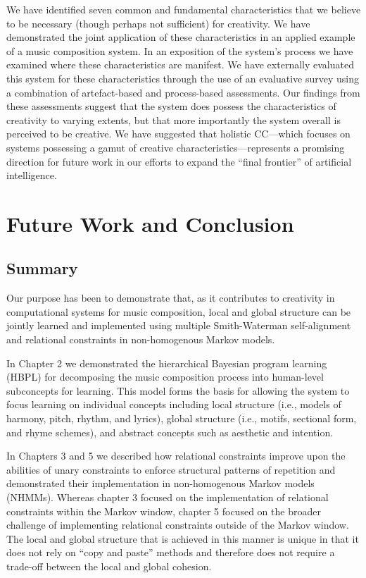 \documentclass[phd,electronic,oneside,twosidetoc,letterpaper,chaptercenter,parttop,lol,lof,lot]{byumsphd}
\begin{document}
We have identified seven common and fundamental characteristics that we believe to be necessary (though perhaps not sufficient) for creativity. We have demonstrated the joint application of these characteristics in an applied example of a music composition system. In an exposition of the system's process we have examined where these characteristics are manifest. We have externally evaluated this system for these characteristics through the use of an evaluative survey using a combination of artefact-based and process-based assessments. Our findings from these assessments suggest that the system does possess the characteristics of creativity to varying extents, but that more importantly the system overall is perceived to be creative. We have suggested that holistic CC---which focuses on systems possessing a gamut of creative characteristics---represents a promising direction for future work in our efforts to expand the ``final frontier'' of artificial intelligence.

\chapter{Future Work and Conclusion}

\section{Summary}

Our purpose has been to demonstrate that, as it contributes to creativity in computational systems for music composition, local and global structure can be jointly learned and implemented using multiple Smith-Waterman self-alignment and relational constraints in non-homogenous Markov models.

In Chapter 2 we demonstrated the hierarchical Bayesian program learning (HBPL) for decomposing the music composition process into human-level subconcepts for learning. This model forms the basis for allowing the system to focus learning on individual concepts including local structure (i.e., models of harmony, pitch, rhythm, and lyrics), global structure (i.e., motifs, sectional form, and rhyme schemes), and abstract concepts such as aesthetic and intention.

In Chapters 3 and 5 we described how relational constraints improve upon the abilities of unary constraints to enforce structural patterns of repetition and demonstrated their implementation in non-homogenous Markov models (NHMMs). Whereas chapter 3 focused on the implementation of relational constraints within the Markov window, chapter 5 focused on the broader challenge of implementing relational constraints outside of the Markov window. The local and global structure that is achieved in this manner is unique in that it does not rely on ``copy and paste'' methods and therefore does not require a trade-off between the local and global cohesion.
\end{document}
